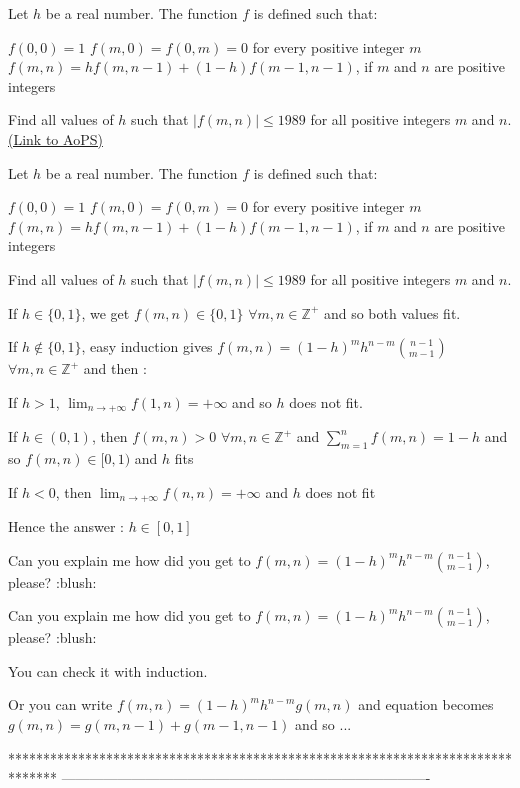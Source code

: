 \begin{problem}
	Let $h$ be a real number. The function $f$ is defined such that:

$f(0,0)=1$
$f(m,0)=f(0,m)=0$  for every positive integer $m$
$f(m,n)=hf(m,n-1)+(1-h)f(m-1,n-1)$, if $m$ and $n$ are positive integers

Find all values of $h$ such that $|f(m,n)| \le 1989$ for all positive integers $m$ and $n$.
	\flushright \href{https://artofproblemsolving.com/community/c6h586428}{(Link to AoPS)}
\end{problem}



\begin{solution}
	\begin{tcolorbox}Let $h$ be a real number. The function $f$ is defined such that:

$f(0,0)=1$
$f(m,0)=f(0,m)=0$  for every positive integer $m$
$f(m,n)=hf(m,n-1)+(1-h)f(m-1,n-1)$, if $m$ and $n$ are positive integers

Find all values of $h$ such that $|f(m,n)| \le 1989$ for all positive integers $m$ and $n$.\end{tcolorbox}
If $h\in\{0,1\}$, we get $f(m,n)\in\{0,1\}$ $\forall m,n\in\mathbb Z^+$ and so both values fit.

If $h\notin\{0,1\}$, easy induction gives $f(m,n)=(1-h)^mh^{n-m}\binom{n-1}{m-1}$ $\forall m,n\in\mathbb Z^+$ and then :

If $h>1$, $\lim_{n\to+\infty} f(1,n)=+\infty$ and so $h$ does not fit.

If $h\in(0,1)$, then $f(m,n)>0$ $\forall m,n\in\mathbb Z^+$ and $\sum_{m=1}^nf(m,n)=1-h$ and so $f(m,n)\in[0,1)$ and $h$ fits

If $h<0$, then $\lim_{n\to+\infty}f(n,n)=+\infty$ and $h$ does not fit

Hence the answer : $\boxed{h\in[0,1]}$
\end{solution}



\begin{solution}
	Can you explain me how did you get to $ f(m,n)=(1-h)^mh^{n-m}\binom{n-1}{m-1} $, please?  :blush:
\end{solution}



\begin{solution}
	\begin{tcolorbox}Can you explain me how did you get to $ f(m,n)=(1-h)^mh^{n-m}\binom{n-1}{m-1} $, please?  :blush:\end{tcolorbox}
You can check it with induction.

Or you can write $f(m,n)=(1-h)^mh^{n-m}g(m,n)$ and equation becomes $g(m,n)=g(m,n-1)+g(m-1,n-1)$ and so ...
\end{solution}
*******************************************************************************
-------------------------------------------------------------------------------

